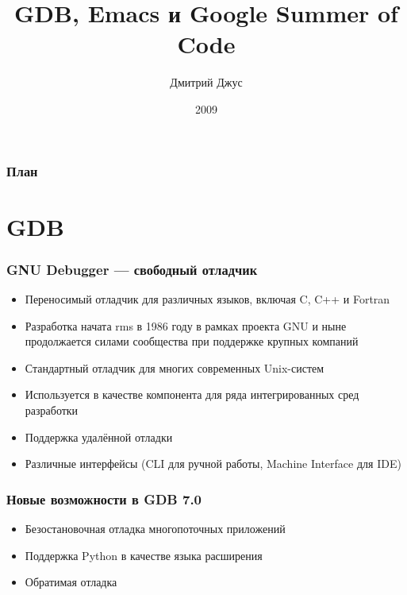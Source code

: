 \documentclass[onlymath]{beamer}
\title{GDB, Emacs и Google Summer of Code }
\author{Дмитрий Джус}
\institute{МГТУ им. Н.Э.Баумана}
\date{2009}
\begin{document}
\begin{frame}
  \titlepage
\end{frame}

\begin{frame}
  \frametitle{План}
  \tableofcontents
\end{frame}

\section{GDB}
\begin{frame}
  \frametitle{GNU Debugger — свободный отладчик}

  \begin{itemize}
  \item Переносимый отладчик для различных языков, включая C, C++ и Fortran
  \item Разработка начата rms в 1986 году в рамках проекта GNU и ныне
    продолжается силами сообщества при поддержке крупных компаний
  \item Стандартный отладчик для многих современных Unix-систем
  \item Используется в качестве компонента для ряда интегрированных
    сред разработки
  \item Поддержка удалённой отладки
  \item Различные интерфейсы (CLI для ручной работы, Machine Interface
    для IDE)
  \end{itemize}
\end{frame}

\begin{frame}
  \frametitle{Новые возможности в GDB 7.0}
  \begin{itemize}
  \item Безостановочная отладка многопоточных приложений
  \item Поддержка Python в качестве языка расширения
  \item Обратимая отладка
  \end{itemize}
\end{frame}
\end{document}
